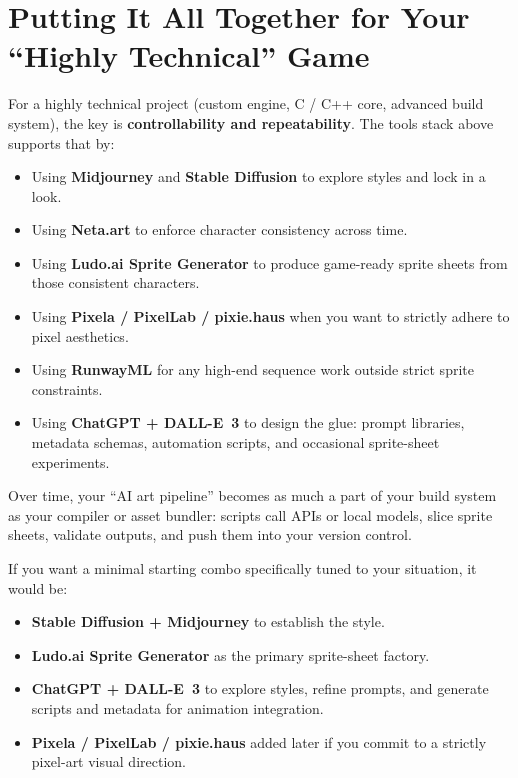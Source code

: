 \documentclass[11pt]{article}
\begin{document}
\section{Putting It All Together for Your ``Highly Technical'' Game}

For a highly technical project (custom engine, C / C++ core, advanced build system), the key is \textbf{controllability and repeatability}. The tools stack above supports that by:

\begin{itemize}
    \item Using \textbf{Midjourney} and \textbf{Stable Diffusion} to explore styles and lock in a look.
    \item Using \textbf{Neta.art} to enforce character consistency across time.
    \item Using \textbf{Ludo.ai Sprite Generator} to produce game-ready sprite sheets from those consistent characters.
    \item Using \textbf{Pixela / PixelLab / pixie.haus} when you want to strictly adhere to pixel aesthetics.
    \item Using \textbf{RunwayML} for any high-end sequence work outside strict sprite constraints.
    \item Using \textbf{ChatGPT + DALL-E~3} to design the glue: prompt libraries, metadata schemas, automation scripts, and occasional sprite-sheet experiments.
\end{itemize}

Over time, your ``AI art pipeline'' becomes as much a part of your build system as your compiler or asset bundler: scripts call APIs or local models, slice sprite sheets, validate outputs, and push them into your version control.

If you want a minimal starting combo specifically tuned to your situation, it would be:
\begin{itemize}
    \item \textbf{Stable Diffusion + Midjourney} to establish the style.
    \item \textbf{Ludo.ai Sprite Generator} as the primary sprite-sheet factory.
    \item \textbf{ChatGPT + DALL-E~3} to explore styles, refine prompts, and generate scripts and metadata for animation integration.
    \item \textbf{Pixela / PixelLab / pixie.haus} added later if you commit to a strictly pixel-art visual direction.
\end{itemize}
\end{document}
